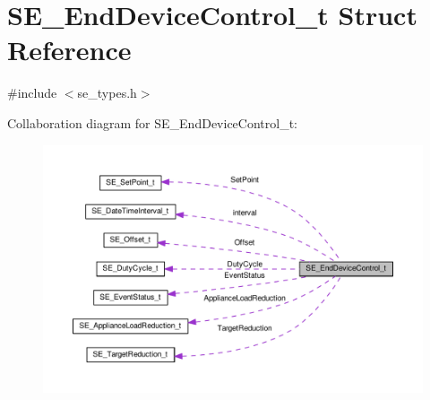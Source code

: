 \hypertarget{structSE__EndDeviceControl__t}{}\section{S\+E\+\_\+\+End\+Device\+Control\+\_\+t Struct Reference}
\label{structSE__EndDeviceControl__t}


{\ttfamily \#include $<$se\+\_\+types.\+h$>$}



Collaboration diagram for S\+E\+\_\+\+End\+Device\+Control\+\_\+t\+:\nopagebreak
\begin{figure}[H]
\begin{center}
\leavevmode
\includegraphics[width=350pt]{structSE__EndDeviceControl__t__coll__graph}
\end{center}
\end{figure}
